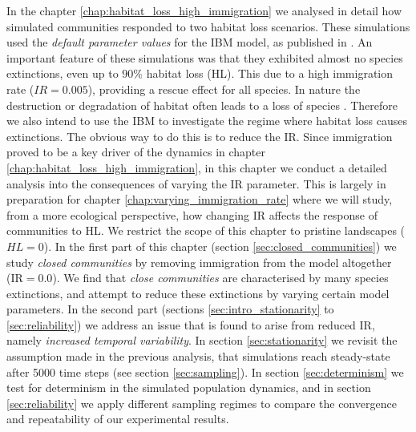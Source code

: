 In the chapter \ref{chap:habitat_loss_high_immigration} we analysed in detail how simulated communities responded to two habitat loss scenarios. These simulations used the \emph{default parameter values} for the IBM model, as published in \cite{lurgi2015effects}. An important feature of these simulations was that they exhibited almost no species extinctions, even up to $90\%$ habitat loss (HL). This due to a high immigration rate ($IR=0.005$), providing a rescue effect for all species. In nature the destruction or degradation of habitat often leads to a loss of species \cite{newbold2015global,foley2005global}. Therefore we also intend to use the IBM to investigate the regime where habitat loss causes extinctions. The obvious way to do this is to reduce the IR. Since immigration proved to be a key driver of the dynamics in chapter \ref{chap:habitat_loss_high_immigration}, in this chapter we conduct a detailed analysis into the consequences of varying the IR parameter. This is largely in preparation for chapter \ref{chap:varying_immigration_rate} where we will study, from a more ecological perspective, how changing IR affects the response of communities to HL. We restrict the scope of this chapter to pristine landscapes ($HL=0$). In the first part of this chapter (section \ref{sec:closed_communities}) we study \emph{closed communities} by removing immigration from the model altogether (IR$=0.0$). We find that \emph{close communities} are characterised by many species extinctions, and attempt to reduce these extinctions by varying certain model parameters. In the second part (sections \ref{sec:intro_stationarity} to \ref{sec:reliability}) we address an issue that is found to arise from reduced IR, namely \emph{increased temporal variability}. In section \ref{sec:stationarity} we revisit the assumption made in the previous analysis, that simulations reach steady-state after 5000 time steps (see section \ref{sec:sampling}). In section \ref{sec:determinism} we test for determinism in the simulated population dynamics, and in section \ref{sec:reliability} we apply different sampling regimes to compare the convergence and repeatability of our experimental results. 




